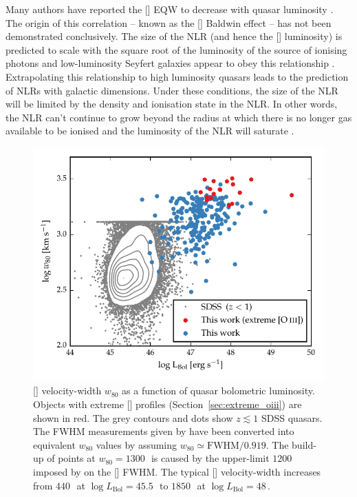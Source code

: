 Many authors have reported the [] EQW to decrease with quasar luminosity \citep[e.g.][]{brotherton96,sulentic04,baskin05b,zhang11,stern12}.
The origin of this correlation -- known as the [] Baldwin effect \citep[e.g.][]{baldwin77} -- has not been demonstrated conclusively.
The size of the NLR (and hence the [] luminosity) is predicted to scale with the square root of the luminosity of the source of ionising photons \citep[e.g.][]{netzer90} and low-luminosity Seyfert galaxies appear to obey this relationship \citep[e.g.][]{bennert02}.
Extrapolating this relationship to high luminosity quasars leads to the prediction of NLRs with galactic dimensions.
Under these conditions, the size of the NLR will be limited by the density and ionisation state in the NLR.
In other words, the NLR can't continue to grow beyond the radius at which there is no longer gas available to be ionised and the luminosity of the NLR will saturate \citep[e.g.][]{hainline13,hainline14}.

\begin{figure}[t!]
    \centering
    \includegraphics[width=\columnwidth]{figures/chapter04/lum_w80.pdf}
    \caption[{[] velocity-width $w_{80}$ as a function of quasar bolometric luminosity.}]{[] velocity-width $w_{80}$ as a function of quasar bolometric luminosity. Objects with extreme [] profiles (Section~\ref{sec:extreme_oiii}) are shown in red. The grey contours and dots show $z\lesssim1$ SDSS quasars. The FWHM measurements given by \citet{shen11} have been converted into equivalent $w_{80}$ values by assuming $w_{80} \simeq \text{FWHM} / 0.919$. The build-up of points at $w_{80}=1300$\,\kms\, is caused by the upper-limit $1200$\,\kms\, imposed by \citet{shen11} on the [] FWHM. The typical [] velocity-width increases from $440$\,\kms\, at $\log L_{\text{Bol}}=45.5$\,\ergs\, to $1850$\,\kms\, at $\log L_{\text{Bol}}=48$\,\ergs.}
    \label{fig:lum_w80}
\end{figure}

